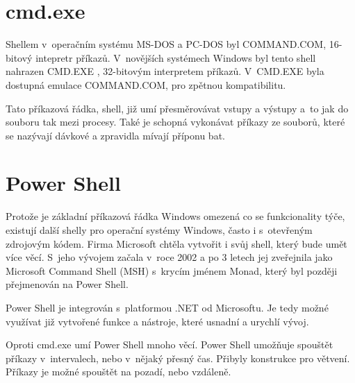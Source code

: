 \documentclass[thesis=M,czech]{FITthesis}[2012/06/26]
\begin{document}



\section{cmd.exe}

Shellem v~operačním systému MS-DOS a PC-DOS byl COMMAND.COM, 16-bitový intepretr příkazů. V~novějších systémech Windows byl tento shell nahrazen CMD.EXE \cite{windowsshell}, 32-bitovým interpretem příkazů. V~CMD.EXE byla dostupná emulace COMMAND.COM, pro zpětnou kompatibilitu.

Tato příkazová řádka, shell, již umí přesměrovávat vstupy a výstupy a~to jak do souboru tak mezi procesy. Také je schopná vykonávat příkazy ze souborů, které se nazývají dávkové a zpravidla mívají příponu bat.



\section{Power Shell}

Protože je základní příkazová řádka Windows omezená co se funkcionality týče, existují další shelly pro operační systémy Windows, často i s~otevřeným zdrojovým kódem. Firma Microsoft chtěla vytvořit i svůj shell, který bude umět více věcí. S~jeho vývojem začala v~roce 2002 a po 3 letech jej zveřejnila jako Microsoft Command Shell (MSH) s~krycím jménem Monad, který byl později přejmenován na Power Shell.

Power Shell je integrován s~platformou .NET \cite{windowsdotnet} od Microsoftu. Je tedy možné využívat již vytvořené funkce a nástroje, které usnadní a urychlí vývoj.

Oproti cmd.exe umí Power Shell mnoho věcí. Power Shell umožňuje spouštět příkazy v~intervalech, nebo v~nějaký přesný čas. Přibyly konstrukce pro větvení. Příkazy je možné spouštět na pozadí, nebo vzdáleně.


\end{document}
